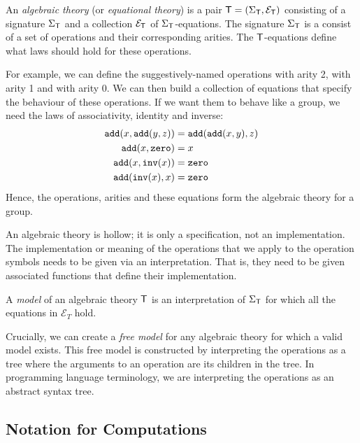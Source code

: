\begin{definition}
    An \emph{algebraic theory} (or \emph{equational theory}) is a pair $\mathsf{T} = (\Sigma_\mathsf{T}, \mathcal{E}_\mathsf{T})$ consisting of a signature $\Sigma_\mathsf{T}$ and a collection $\mathcal{E}_\mathsf{T}$ of $\Sigma_\mathsf{T}$-equations. The signature $\Sigma_\mathsf{T}$ is a consist of a set of operations and their corresponding arities. The $\mathsf{T}$-equations define what laws should hold for these operations.
\end{definition}

For example, we can define the suggestively-named operations  with arity 2,  with arity 1 and  with arity 0. We can then build a collection of equations that specify the behaviour of these operations. If we want them to behave like a group, we need the laws of associativity, identity and inverse:
\begin{align*}
    \mathtt{add}(x, \mathtt{add}(y, z)) &= \mathtt{add}(\mathtt{add}(x, y), z) \\
    \mathtt{add}(x, \mathtt{zero}) &= x \\
    \mathtt{add}(x, \mathtt{inv}(x)) &= \mathtt{zero} \\
    \mathtt{add}(\mathtt{inv}(x), x) &= \mathtt{zero}
\end{align*}
Hence, the operations, arities and these equations form the algebraic theory for a group.

An algebraic theory is hollow; it is only a specification, not an implementation. The implementation or meaning of the operations that we apply to the operation symbols needs to be given via an interpretation. That is, they need to be given associated functions that define their implementation.

\begin{definition}[Model]
    A \emph{model} of an algebraic theory $\mathsf{T}$ is an interpretation of $\Sigma_\mathsf{T}$ for which all the equations in $\mathcal{E}_T$ hold.
\end{definition}

Crucially, we can create a \emph{free model} for any algebraic theory for which a valid model exists. This free model is constructed by interpreting the operations as a tree where the arguments to an operation are its children in the tree. In programming language terminology, we are interpreting the operations as an abstract syntax tree.

\subsection{Notation for Computations}


